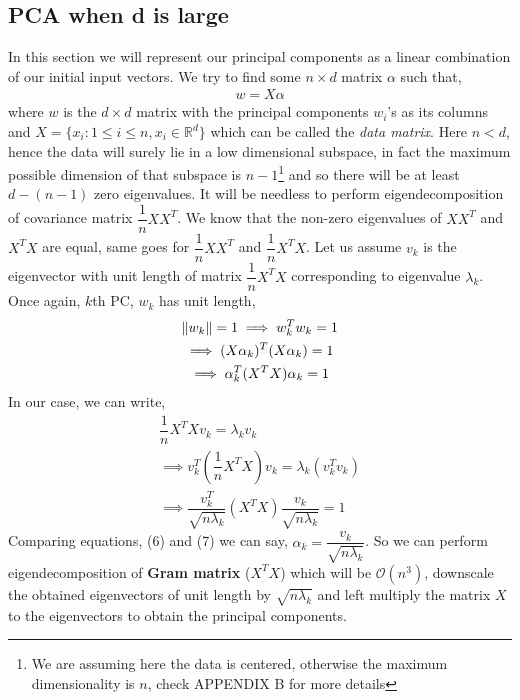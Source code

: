 \documentclass[12pt,a4paper]{article}
\begin{document}
\subsection{PCA when d is large} \label{Alternate perspective}
In this section we will represent our principal components as a linear combination of our initial input vectors. We try to find some $n \times d$ matrix $\alpha$ such that,
\begin{align}
    w  = X \alpha
\end{align}
where $w$ is the $d \times d$ matrix with the principal components $w_i$'s as its columns and $X = \{x_i : 1 \leq i \leq n, x_i \in \mathbb{R}^d\}$ which can be called the \textit{data matrix}. Here $n < d$, hence the data will surely lie in a low dimensional subspace, in fact the maximum possible dimension of that subspace is $n-1$\footnote{We are assuming here the data is centered, otherwise the maximum dimensionality is $n$, check APPENDIX B for more details} and so there will be  at least $d-(n-1)$ zero eigenvalues. It will be needless to perform eigendecomposition of covariance matrix $\dfrac{1}{n}XX^T$. We know that the non-zero eigenvalues of $XX^T$ and $X^TX$ are equal, same goes for $\dfrac{1}{n}XX^T$ and $\dfrac{1}{n}X^TX$. Let us assume $v_k$ is the eigenvector with unit length of matrix $\dfrac{1}{n}X^TX$ corresponding to eigenvalue $\lambda_k$. Once again, $k$th PC, $w_k$ has unit length,
\begin{gather}
    \norm{w_k} = 1 \implies w_k^T w_k = 1 \nonumber \\
    \implies (X \alpha_k)^T (X \alpha_k) =1 \nonumber \\
    \implies \alpha_k^T(X^TX)\alpha_k = 1 
\end{gather}
In our case, we can write, 
\begin{gather}
    \dfrac{1}{n} X^TX v_k= \lambda_k v_k \nonumber \\
    \implies v_k^T (\dfrac{1}{n} X^TX) v_k = \lambda_k (v_k^Tv_k) \nonumber \\
    \implies \dfrac{v_k^T}{\sqrt{n\lambda_k}} (X^TX) \dfrac{v_k}{\sqrt{n\lambda_k}} = 1
\end{gather}
Comparing equations, (6) and (7) we can say, $\alpha_k = \dfrac{v_k}{\sqrt{n \lambda_k}}$.
So we can perform eigendecomposition of \textbf{Gram matrix} ($X^TX$) which will be $\mathcal{O}(n^3)$, downscale the obtained eigenvectors of unit length by $\sqrt{n \lambda_k}$ and left multiply the matrix $X$ to the eigenvectors to obtain the principal components. 
\end{document}
